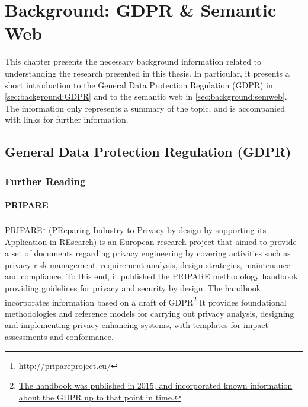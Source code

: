 \chapter{Background: GDPR \& Semantic Web}
\label{chapter:background}

This chapter presents the necessary background information related to understanding the research presented in this thesis. In particular, it presents a short introduction to the General Data Protection Regulation (GDPR) in \autoref{sec:background:GDPR} and to the semantic web in \autoref{sec:background:semweb}. The information only represents a summary of the topic, and is accompanied with links for further information.

\section{General Data Protection Regulation (GDPR)}\label{sec:background:GDPR}

\subsection*{Further Reading}

\subsubsection{PRIPARE}
PRIPARE\footnote{\url{http://pripareproject.eu/}} (PReparing Industry to Privacy-by-design by supporting its Application in REsearch) is an European research project that aimed to provide a set of documents regarding privacy engineering by covering activities such as privacy risk management, requirement analysis, design strategies, maintenance and compliance. To this end, it published the PRIPARE methodology handbook \cite{noauthor_pripare-methodology-handbook-final-feb-24-2016.pdf_nodate} providing guidelines for privacy and security by design. The handbook incorporates information based on a draft of GDPR\footnote{\url{The handbook was published in 2015, and incorporated known information about the GDPR up to that point in time.}} It provides foundational methodologies and reference models for carrying out privacy analysis, designing and implementing privacy enhancing systems, with templates for impact assessments and conformance. 

